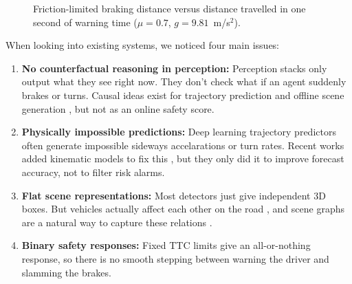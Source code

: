 \documentclass[preprint,12pt]{elsarticle}
\begin{document}
\begin{figure}[H]
\centering
{}
\captionsetup{singlelinecheck = false, format= hang, justification=justified, font=footnotesize, labelsep=space}
\caption{Friction-limited braking distance versus distance travelled in one second of warning time ($\mu=0.7$, $g=9.81$~m/s$^2$).}
\label{fig_intro}
\end{figure}

When looking into existing systems, we noticed four main issues:
\begin{enumerate}
    \item \textbf{No counterfactual reasoning in perception:} Perception stacks only output what they see right now. They don't check what if an agent suddenly brakes or turns. Causal ideas exist for trajectory prediction \cite{han2025cicr, wang2025beyond} and offline scene generation \cite{jing2026counterscene}, but not as an online safety score.
    \item \textbf{Physically impossible predictions:} Deep learning trajectory predictors often generate impossible sideways accelarations or turn rates. Recent works added kinematic models to fix this \cite{liao2024physics, baden2025tpk, chugh2025xtrack}, but they only did it to improve forecast accuracy, not to filter risk alarms.
    \item \textbf{Flat scene representations:} Most detectors just give independent 3D boxes. But vehicles actually affect each other on the road \cite{ahmadi2025critic}, and scene graphs are a natural way to capture these relations \cite{hallyburton2025neuspaper}.
    \item \textbf{Binary safety responses:} Fixed TTC limits give an all-or-nothing response, so there is no smooth stepping between warning the driver and slamming the brakes.
\end{enumerate}
\end{document}
